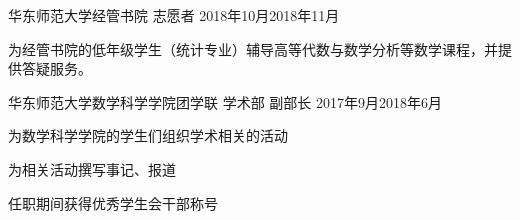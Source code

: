 \begin{projitem} {华东师范大学经管书院}
    {志愿者}
    {2018年10月}{2018年11月}
    \item 为经管书院的低年级学生（统计专业）辅导高等代数与数学分析等数学课程，并提供答疑服务。
\end{projitem}
\begin{projitem}
    {华东师范大学数学科学学院团学联}
    {学术部 副部长}
    {2017年9月}{2018年6月}
    \item 为数学科学学院的学生们组织学术相关的活动
    \item 为相关活动撰写事记、报道
    \item 任职期间获得优秀学生会干部称号
\end{projitem}

\endinput